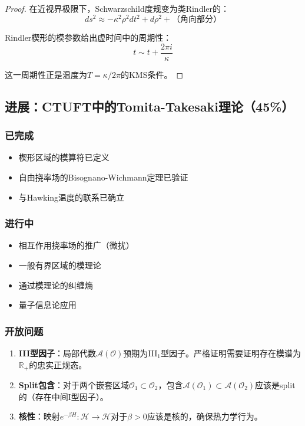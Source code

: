 \begin{proof}
在近视界极限下，Schwarzschild度规变为类Rindler的：
\begin{equation}
    ds^2 \approx -\kappa^2 \rho^2 dt^2 + d\rho^2 + \text{（角向部分）}
\end{equation}

Rindler楔形的模参数给出虚时间中的周期性：
\begin{equation}
    t \sim t + \frac{2\pi i}{\kappa}
\end{equation}

这一周期性正是温度为$T = \kappa/2\pi$的KMS条件。
\end{proof}

\subsection{进展：CTUFT中的Tomita-Takesaki理论（45\%）}

\subsubsection{已完成}
\begin{itemize}
    \item 楔形区域的模算符已定义
    \item 自由挠率场的Bisognano-Wichmann定理已验证
    \item 与Hawking温度的联系已确立
\end{itemize}

\subsubsection{进行中}
\begin{itemize}
    \item 相互作用挠率场的推广（微扰）
    \item 一般有界区域的模理论
    \item 通过模理论的纠缠熵
    \item 量子信息论应用
\end{itemize}

\subsubsection{开放问题}
\begin{enumerate}
    \item \textbf{III型因子}：局部代数$\mathcal{A}(\mathcal{O})$预期为III$_1$型因子。严格证明需要证明存在模谱为$\mathbb{R}_+$的忠实正规态。
    
    \item \textbf{Split包含}：对于两个嵌套区域$\mathcal{O}_1 \subset \mathcal{O}_2$，包含$\mathcal{A}(\mathcal{O}_1) \subset \mathcal{A}(\mathcal{O}_2)$应该是split的（存在中间I型因子）。
    
    \item \textbf{核性}：映射$e^{-\beta H} : \mathcal{H} \to \mathcal{H}$对于$\beta > 0$应该是核的，确保热力学行为。
\end{enumerate}

